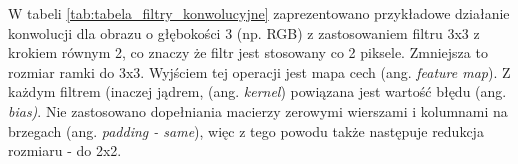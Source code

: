W tabeli \ref{tab:tabela_filtry_konwolucyjne} zaprezentowano przykładowe działanie konwolucji dla obrazu o głębokości 3 (np. RGB) z zastosowaniem filtru 3x3 z krokiem równym 2, co znaczy że filtr jest stosowany co 2 piksele. Zmniejsza to rozmiar ramki do 3x3. Wyjściem tej operacji jest mapa cech (ang. \textit{feature map}). Z każdym filtrem (inaczej jądrem, (ang. \textit{kernel}) powiązana jest wartość błędu (ang. \textit{bias)}. Nie zastosowano dopełniania macierzy zerowymi wierszami i kolumnami na brzegach (ang. \textit{padding - same}), więc z tego powodu także następuje redukcja rozmiaru - do 2x2. 

\begin{table}[h]
\centering
\caption[Short Heading]{Przykładowe działanie konwolucji.}
\end{table}
